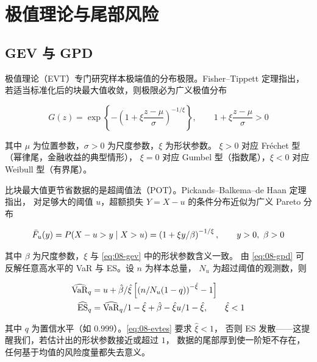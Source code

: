 \section{极值理论与尾部风险}

\subsection{GEV 与 GPD}

极值理论（EVT）专门研究样本极端值的分布极限。Fisher--Tippett 定理指出，
若适当标准化后的块最大值收敛，则极限必为广义极值分布

\begin{equation}
  G(z) = \exp\left\{-\left(1 + \xi\frac{z - \mu}{\sigma}\right)^{-1/\xi}\right\},
  \qquad 1 + \xi\frac{z-\mu}{\sigma} > 0
  \label{eq:08-gev}
\end{equation}

其中 $\mu$ 为位置参数，$\sigma > 0$ 为尺度参数，$\xi$ 为形状参数。
$\xi > 0$ 对应 Fréchet 型（幂律尾，金融收益的典型情形），
$\xi = 0$ 对应 Gumbel 型（指数尾），$\xi < 0$ 对应 Weibull 型（有界尾）。

比块最大值更节省数据的是超阈值法（POT）。Pickands--Balkema--de Haan 定理指出，
对足够大的阈值 $u$，超额损失 $Y = X - u$ 的条件分布近似为广义 Pareto 分布

\begin{equation}
  \bar{F}_u(y) = P(X - u > y \mid X > u) =
  \left(1 + \xi y/\beta\right)^{-1/\xi}, \qquad y > 0,\ \beta > 0
  \label{eq:08-gpd}
\end{equation}

其中 $\beta$ 为尺度参数，$\xi$ 与 \cref{eq:08-gev} 中的形状参数含义一致。
由 \cref{eq:08-gpd} 可反解任意高水平的 VaR 与 ES。设 $n$ 为样本总量，
$N_u$ 为超过阈值的观测数，则

\begin{align}
  \widehat{\operatorname{VaR}}_q &= u + \hat{\beta}/\hat{\xi}
    \left[\left(n/N_u(1-q)\right)^{-\hat{\xi}} - 1\right]
    \label{eq:08-evtvar} \\
  \widehat{\operatorname{ES}}_q &= \widehat{\operatorname{VaR}}_q/1-\hat{\xi} + \hat{\beta} - \hat{\xi}u/1-\hat{\xi},
  \qquad \hat{\xi} < 1
    \label{eq:08-evtes}
\end{align}

其中 $q$ 为置信水平（如 $0.999$）。\cref{eq:08-evtes} 要求 $\hat{\xi} < 1$，
否则 ES 发散——这提醒我们，若估计出的形状参数接近或超过 $1$，
数据的尾部厚到使一阶矩不存在，任何基于均值的风险度量都失去意义。

